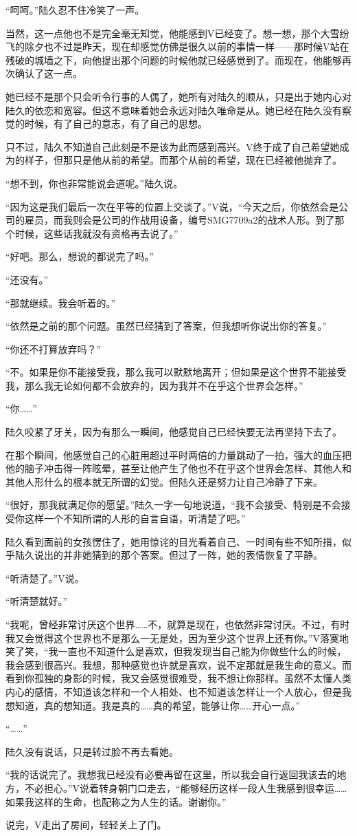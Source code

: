 “呵呵。”陆久忍不住冷笑了一声。

当然，这一点他也不是完全毫无知觉，他能感到V已经变了。想一想，那个大雪纷飞的除夕也不过是昨天，现在却感觉仿佛是很久以前的事情一样——那时候V站在残破的城墙之下，向他提出那个问题的时候他就已经感觉到了。而现在，他能够再次确认了这一点。

她已经不是那个只会听令行事的人偶了，她所有对陆久的顺从，只是出于她内心对陆久的依恋和宽容。但这不意味着她会永远对陆久唯命是从。她已经在陆久没有察觉的时候，有了自己的意志，有了自己的思想。

只不过，陆久不知道自己此刻是不是该为此而感到高兴。V终于成了自己希望她成为的样子，但那只是他从前的希望。而那个从前的希望，现在已经被他抛弃了。

“想不到，你也非常能说会道呢。”陆久说。

“因为这是我们最后一次在平等的位置上交谈了。”V说，“今天之后，你依然会是公司的雇员，而我则会是公司的作战用设备，编号SMG7709a2的战术人形。到了那个时候，这些话我就没有资格再去说了。”

“好吧。那么，想说的都说完了吗。”

“还没有。”

“那就继续。我会听着的。”

“依然是之前的那个问题。虽然已经猜到了答案，但我想听你说出你的答复。”

“你还不打算放弃吗？”

“不。如果是你不能接受我，那么我可以默默地离开；但如果是这个世界不能接受我，那么我无论如何都不会放弃的，因为我并不在乎这个世界会怎样。”

“你……”

陆久咬紧了牙关，因为有那么一瞬间，他感觉自己已经快要无法再坚持下去了。

在那个瞬间，他感觉自己的心脏用超过平时两倍的力量跳动了一拍，强大的血压把他的脑子冲击得一阵眩晕，甚至让他产生了他也不在乎这个世界会怎样、其他人和其他人形什么的根本就无所谓的幻觉。但陆久还是努力让自己冷静了下来。

“很好，那我就满足你的愿望。”陆久一字一句地说道，“我不会接受、特别是不会接受你这样一个不知所谓的人形的自言自语，听清楚了吧。”

陆久看到面前的女孩愣住了，她用惊诧的目光看着自己、一时间有些不知所措，似乎陆久说出的并非她猜到的那个答案。但过了一阵，她的表情恢复了平静。

“听清楚了。”V说。

“听清楚就好。” 

“我呢，曾经非常讨厌这个世界……不，就算是现在，也依然非常讨厌。不过，有时我又会觉得这个世界也不是那么一无是处，因为至少这个世界上还有你。”V落寞地笑了笑，“我一直也不知道什么是喜欢，但我发现当自己能为你做些什么的时候，我会感到很高兴。我想，那种感觉也许就是喜欢，说不定那就是我生命的意义。而看到你孤独的身影的时候，我又会感觉很难受，我不想让你那样。虽然不太懂人类内心的感情，不知道该怎样和一个人相处、也不知道该怎样让一个人放心，但是我想知道，真的想知道。我是真的……真的希望，能够让你……开心一点。”

“……”

陆久没有说话，只是转过脸不再去看她。

“我的话说完了。我想我已经没有必要再留在这里，所以我会自行返回我该去的地方，不必担心。”V说着转身朝门口走去，“能够经历这样一段人生我感到很幸运……如果我这样的生命，也配称之为人生的话。谢谢你。”

说完，V走出了房间，轻轻关上了门。